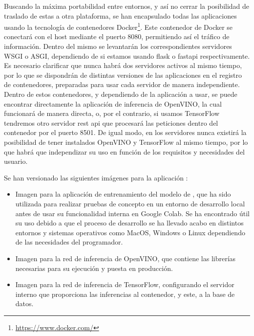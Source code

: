 Buscando la máxima portabilidad entre entornos, y así no cerrar la posibilidad de traslado de estas a otra plataforma, se han encapsulado todas las aplicaciones usando la tecnología de contenedores Docker\footnote{\url{https://www.docker.com/}}.
Este contenedor de Docker se conectará con el host mediante el puerto 8080, permitiendo así el tráfico de información.
Dentro del mismo se levantarán los correspondientes servidores WSGI o ASGI, dependiendo de si estamos usando flask o fastapi respectivamente.
Es necesario clarificar que nunca habrá dos servidores activos al mismo tiempo, por lo que se dispondrán de distintas versiones de las aplicaciones en el registro de contenedores, preparadas para usar cada servidor de manera independiente.
Dentro de estos contenedores, y dependiendo de la aplicación a usar, se puede encontrar directamente la aplicación de inferencia de OpenVINO, la cual funcionará de manera directa, o, por el contrario, si usamos TensorFlow tendremos otro servidor rest api que procesará las peticiones dentro del contenedor por el puerto 8501.
De igual modo, en los servidores nunca existirá la posibilidad de tener instalados OpenVINO y TensorFlow al mismo tiempo, por lo que habrá que independizar su uso en función de los requisitos y necesidades del usuario.

Se han versionado las siguientes imágenes para la aplicación :
\begin{itemize}
    \item Imagen para la aplicación de entrenamiento del modelo de , que ha sido utilizada para realizar pruebas de concepto en un entorno de desarrollo local antes de usar su funcionalidad
    interna en Google Colab.
    Se ha encontrado útil su uso debido a que el proceso de desarrollo se ha llevado acabo en distintos entornos y sistemas operativos como MacOS, Windows o Linux dependiendo de las necesidades del programador.
    \item Imagen para la red de inferencia de OpenVINO, que contiene las librerías necesarias para su ejecución y puesta en producción.
    \item Imagen para la red de inferencia de TensorFlow, configurando el servidor interno que proporciona las inferencias al contenedor, y este, a la base de datos.
\end{itemize}

